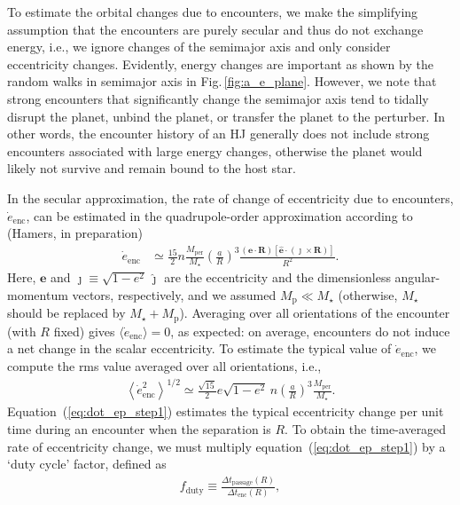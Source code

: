 \documentclass[iop,usenatbib]{emulateapj}
\newcommand{\F}{Fig.}
\newcommand{\ve}[1]{\boldsymbol{#1}}
\newcommand{\unit}[1]{\hat{\boldsymbol{#1}}}
\newcommand{\mper}{M_\mathrm{per}}
\begin{document}
To estimate the orbital changes due to encounters, we make the simplifying assumption that the encounters are purely secular and thus do not exchange energy, i.e., we ignore changes of the semimajor axis and only consider eccentricity changes. Evidently, energy changes are important as shown by the random walks in semimajor axis in \F\,\ref{fig:a_e_plane}. However, we note that strong encounters that significantly change the semimajor axis tend to tidally disrupt the planet, unbind the planet, or transfer the planet to the perturber. In other words, the encounter history of an HJ generally does not include strong encounters associated with large energy changes, otherwise the planet would likely not survive and remain bound to the host star.

In the secular approximation, the rate of change of eccentricity due to encounters, $\dot{e}_\mathrm{enc}$, can be estimated in the quadrupole-order approximation according to (Hamers, in preparation)
\begin{align}
\dot{e}_\mathrm{enc} &\simeq  \frac{15}{2} n \frac{\mper}{M_\star} \left ( \frac{a}{R} \right )^3 \frac {\left ( \ve{e} \cdot \ve{R} \right ) \left [ \unit{e} \cdot \left (\ve{\jmath} \times \ve{R} \right ) \right ]}{R^2}.
\end{align}
Here, $\ve{e}$ and $\ve{\jmath}\equiv \sqrt{1-e^2} \, \unit{\jmath}$ are the eccentricity and the dimensionless angular-momentum vectors, respectively, and we assumed $M_\mathrm{p} \ll M_\star$ (otherwise, $M_\star$ should be replaced by $M_\star + M_\mathrm{p}$). Averaging over all orientations of the encounter (with $R$ fixed) gives $\langle \dot{e}_\mathrm{enc} \rangle = 0$, as expected: on average, encounters do not induce a net change in the scalar eccentricity. To estimate the typical value of $\dot{e}_\mathrm{enc}$, we compute the rms value averaged over all orientations, i.e.,
\begin{align}
\label{eq:dot_ep_step1}
\left \langle \dot{e}^2_\mathrm{enc} \right \rangle^{1/2} \simeq \frac{\sqrt{15}}{2} e \sqrt{1-e^2} \, n \left ( \frac{a}{R} \right )^3 \frac{\mper}{M_\star}.
\end{align}
Equation~(\ref{eq:dot_ep_step1}) estimates the typical eccentricity change per unit time during an encounter when the separation is $R$. To obtain the time-averaged rate of eccentricity change, we must multiply equation~(\ref{eq:dot_ep_step1}) by a `duty cycle' factor, defined as
\begin{align}
\label{eq:f_duty_def}
f_\mathrm{duty} \equiv \frac{\Delta t_\mathrm{passage}(R)}{\Delta t_\mathrm{enc}(R)},
\end{align}
\end{document}
